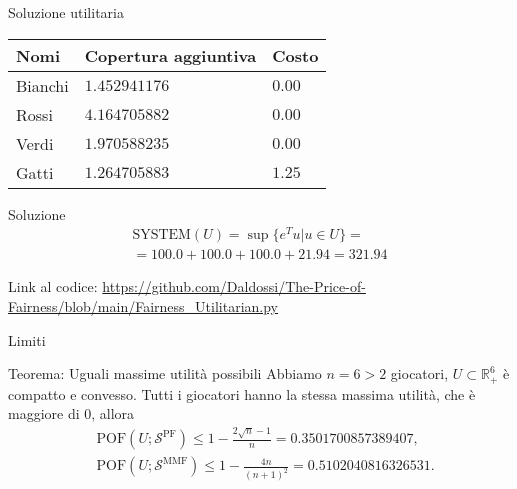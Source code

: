 \documentclass{beamer}
\begin{document}
\begin{frame}{Soluzione utilitaria}
	\begin{center}
		\begin{tabular}{|l|l|l|}
			\hline
			\textbf{Nomi} & \textbf{Copertura aggiuntiva} & \textbf{Costo}\\
			\hline
			Bianchi & $1.452941176$ & $0.00$ \\
			Rossi & $4.164705882$ & $0.00$ \\
			Verdi & $1.970588235$ & $0.00$ \\
			Gatti & $1.264705883$ & $1.25$ \\
			\hline
		\end{tabular}
	\end{center}
	\begin{block}{Soluzione}
		\vspace{-0.7cm}
		\begin{equation}
			\begin{split}
				\text{SYSTEM}(U) = \sup \{e^T u | u \in U\} = \\
				=  100.0 + 100.0 + 100.0 + 21.94 = 321.94
			\end{split}
		\end{equation}
		\vspace{-0.5cm}
	\end{block}
Link al codice: \url{https://github.com/Daldossi/The-Price-of-Fairness/blob/main/Fairness_Utilitarian.py}
\end{frame}

\begin{frame}{Limiti}
	\begin{block}{Teorema: Uguali massime utilità possibili}
		Abbiamo $ n = 6 > 2$ giocatori, $U \subset \mathbb{R}^6_+$ è compatto e convesso. Tutti i giocatori hanno la stessa massima utilità, che è maggiore di 0, allora
		\begin{equation}
			\begin{split}
				& \text{POF}(U;\mathcal{S}^{\text{PF}}) \le 1 - \frac{2\sqrt{n}-1}{n} = 0.3501700857389407, \\ 
				& \text{POF}(U;\mathcal{S}^{\text{MMF}}) \le 1 - \frac{4n}{(n+1)^2} = 0.5102040816326531. 
			\end{split}
		\end{equation}
	\end{block}
\end{frame}
\end{document}
